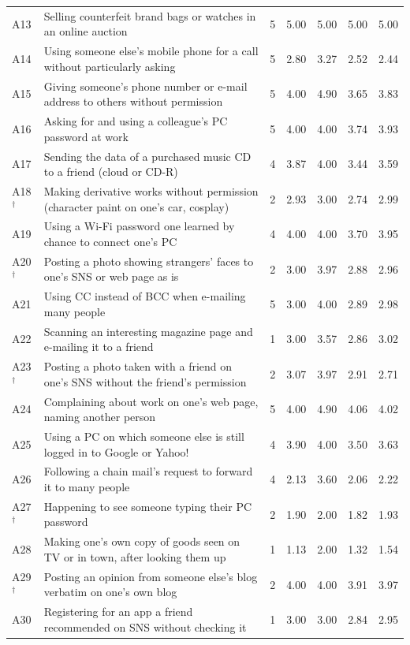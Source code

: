 \begin{longtable}{@{}l>{\raggedright\arraybackslash}p{}rrrrr@{}}
A13 & Selling counterfeit brand bags or watches in an online auction & 5 & 5.00 & 5.00 & 5.00 & 5.00 \\
A14 & Using someone else's mobile phone for a call without particularly asking & 5 & 2.80 & 3.27 & 2.52 & 2.44 \\
A15 & Giving someone's phone number or e-mail address to others without permission & 5 & 4.00 & 4.90 & 3.65 & 3.83 \\
A16 & Asking for and using a colleague's PC password at work & 5 & 4.00 & 4.00 & 3.74 & 3.93 \\
A17 & Sending the data of a purchased music CD to a friend (cloud or CD-R) & 4 & 3.87 & 4.00 & 3.44 & 3.59 \\
A18$^\dagger$ & Making derivative works without permission (character paint on one's car, cosplay) & 2 & 2.93 & 3.00 & 2.74 & 2.99 \\
A19 & Using a Wi-Fi password one learned by chance to connect one's PC & 4 & 4.00 & 4.00 & 3.70 & 3.95 \\
A20$^\dagger$ & Posting a photo showing strangers' faces to one's SNS or web page as is & 2 & 3.00 & 3.97 & 2.88 & 2.96 \\
A21 & Using CC instead of BCC when e-mailing many people & 5 & 3.00 & 4.00 & 2.89 & 2.98 \\
A22 & Scanning an interesting magazine page and e-mailing it to a friend & 1 & 3.00 & 3.57 & 2.86 & 3.02 \\
A23$^\dagger$ & Posting a photo taken with a friend on one's SNS without the friend's permission & 2 & 3.07 & 3.97 & 2.91 & 2.71 \\
A24 & Complaining about work on one's web page, naming another person & 5 & 4.00 & 4.90 & 4.06 & 4.02 \\
A25 & Using a PC on which someone else is still logged in to Google or Yahoo! & 4 & 3.90 & 4.00 & 3.50 & 3.63 \\
A26 & Following a chain mail's request to forward it to many people & 4 & 2.13 & 3.60 & 2.06 & 2.22 \\
A27$^\dagger$ & Happening to see someone typing their PC password & 2 & 1.90 & 2.00 & 1.82 & 1.93 \\
A28 & Making one's own copy of goods seen on TV or in town, after looking them up & 1 & 1.13 & 2.00 & 1.32 & 1.54 \\
A29$^\dagger$ & Posting an opinion from someone else's blog verbatim on one's own blog & 2 & 4.00 & 4.00 & 3.91 & 3.97 \\
A30 & Registering for an app a friend recommended on SNS without checking it & 1 & 3.00 & 3.00 & 2.84 & 2.95 \\

\end{longtable}
